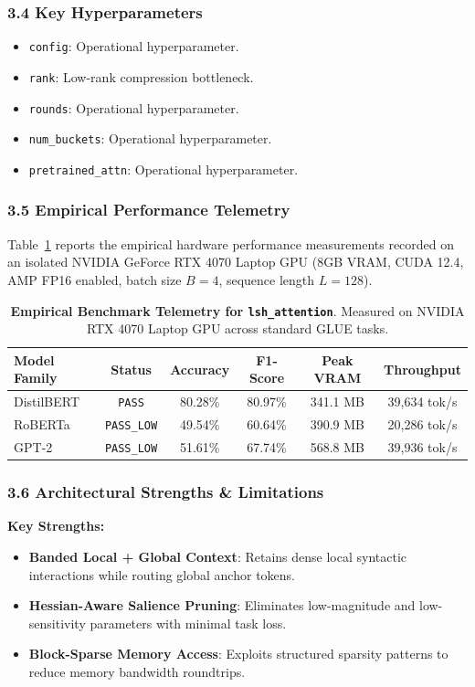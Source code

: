 \subsubsection*{3.4 Key Hyperparameters}
\begin{itemize}
    \item \texttt{config}: Operational hyperparameter.
    \item \texttt{rank}: Low-rank compression bottleneck.
    \item \texttt{rounds}: Operational hyperparameter.
    \item \texttt{num\_buckets}: Operational hyperparameter.
    \item \texttt{pretrained\_attn}: Operational hyperparameter.
\end{itemize}

\subsubsection*{3.5 Empirical Performance Telemetry}
Table~\ref{tab:telemetry_lsh_attention} reports the empirical hardware performance measurements recorded on an isolated NVIDIA GeForce RTX 4070 Laptop GPU (8GB VRAM, CUDA 12.4, AMP FP16 enabled, batch size $B=4$, sequence length $L=128$).

\begin{table}[h]
\centering
\small
\caption{\textbf{Empirical Benchmark Telemetry for \texttt{lsh\_attention}}. Measured on NVIDIA RTX 4070 Laptop GPU across standard GLUE tasks.}
\label{tab:telemetry_lsh_attention}
\begin{tabular*}{\columnwidth}{@{\extracolsep{\fill}}lccccc}
\toprule
\textbf{Model Family} & \textbf{Status} & \textbf{Accuracy} & \textbf{F1-Score} & \textbf{Peak VRAM} & \textbf{Throughput} \\
\midrule
DistilBERT & \texttt{PASS} & 80.28\% & 80.97\% & 341.1 MB & 39,634 tok/s \\
RoBERTa & \texttt{PASS\_LOW} & 49.54\% & 60.64\% & 390.9 MB & 20,286 tok/s \\
GPT-2 & \texttt{PASS\_LOW} & 51.61\% & 67.74\% & 568.8 MB & 39,936 tok/s \\
\bottomrule
\end{tabular*}
\end{table}

\subsubsection*{3.6 Architectural Strengths \& Limitations}
\textbf{Key Strengths:}
\begin{itemize}
    \item \textbf{Banded Local + Global Context}: Retains dense local syntactic interactions while routing global anchor tokens.
    \item \textbf{Hessian-Aware Salience Pruning}: Eliminates low-magnitude and low-sensitivity parameters with minimal task loss.
    \item \textbf{Block-Sparse Memory Access}: Exploits structured sparsity patterns to reduce memory bandwidth roundtrips.
\end{itemize}


